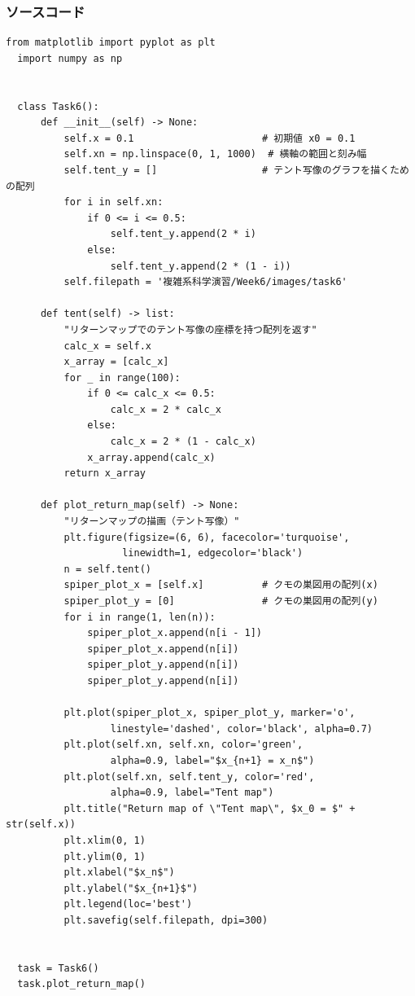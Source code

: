 \subsubsection{ソースコード}
\begin{lstlisting}[caption=task6]
  from matplotlib import pyplot as plt
  import numpy as np


  class Task6():
      def __init__(self) -> None:
          self.x = 0.1                      # 初期値 x0 = 0.1
          self.xn = np.linspace(0, 1, 1000)  # 横軸の範囲と刻み幅
          self.tent_y = []                  # テント写像のグラフを描くための配列
          for i in self.xn:
              if 0 <= i <= 0.5:
                  self.tent_y.append(2 * i)
              else:
                  self.tent_y.append(2 * (1 - i))
          self.filepath = '複雑系科学演習/Week6/images/task6'

      def tent(self) -> list:
          "リターンマップでのテント写像の座標を持つ配列を返す"
          calc_x = self.x
          x_array = [calc_x]
          for _ in range(100):
              if 0 <= calc_x <= 0.5:
                  calc_x = 2 * calc_x
              else:
                  calc_x = 2 * (1 - calc_x)
              x_array.append(calc_x)
          return x_array

      def plot_return_map(self) -> None:
          "リターンマップの描画（テント写像）"
          plt.figure(figsize=(6, 6), facecolor='turquoise',
                    linewidth=1, edgecolor='black')
          n = self.tent()
          spiper_plot_x = [self.x]          # クモの巣図用の配列(x)
          spiper_plot_y = [0]               # クモの巣図用の配列(y)
          for i in range(1, len(n)):
              spiper_plot_x.append(n[i - 1])
              spiper_plot_x.append(n[i])
              spiper_plot_y.append(n[i])
              spiper_plot_y.append(n[i])

          plt.plot(spiper_plot_x, spiper_plot_y, marker='o',
                  linestyle='dashed', color='black', alpha=0.7)
          plt.plot(self.xn, self.xn, color='green',
                  alpha=0.9, label="$x_{n+1} = x_n$")
          plt.plot(self.xn, self.tent_y, color='red',
                  alpha=0.9, label="Tent map")
          plt.title("Return map of \"Tent map\", $x_0 = $" + str(self.x))
          plt.xlim(0, 1)
          plt.ylim(0, 1)
          plt.xlabel("$x_n$")
          plt.ylabel("$x_{n+1}$")
          plt.legend(loc='best')
          plt.savefig(self.filepath, dpi=300)


  task = Task6()
  task.plot_return_map()
\end{lstlisting}


